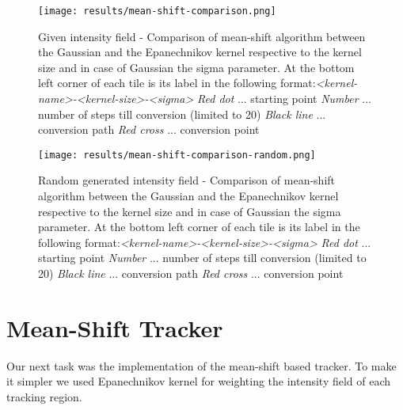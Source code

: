 \documentclass[runningheads]{llncs}
\begin{document}
\begin{figure}
    \centering
    \texttt{[image: results/mean-shift-comparison.png]}
    \caption{Given intensity field - Comparison of mean-shift algorithm between the Gaussian and the Epanechnikov kernel respective to the kernel size and in case of Gaussian the sigma parameter. At the bottom left corner of each tile is its label in the following format:\newline \textit{\textless kernel-name\textgreater-\textless kernel-size\textgreater-\textless sigma\textgreater}
    \newline \textit{Red dot} ... starting point
    \newline \textit{Number} ... number of steps till conversion (limited to 20)
    \newline \textit{Black line} ... conversion path
    \newline \textit{Red cross} ... conversion point}
    \label{img_meanshift}
\end{figure}

\begin{figure}
    \centering
    \texttt{[image: results/mean-shift-comparison-random.png]}
    \caption{Random generated intensity field - Comparison of mean-shift algorithm between the Gaussian and the Epanechnikov kernel respective to the kernel size and in case of Gaussian the sigma parameter. At the bottom left corner of each tile is its label in the following format:\newline \textit{\textless kernel-name\textgreater-\textless kernel-size\textgreater-\textless sigma\textgreater}
    \newline \textit{Red dot} ... starting point
    \newline \textit{Number} ... number of steps till conversion (limited to 20)
    \newline \textit{Black line} ... conversion path
    \newline \textit{Red cross} ... conversion point}
    \label{img_meanshift_random}
\end{figure}

\newpage
\section{Mean-Shift Tracker}

Our next task was the implementation of the mean-shift based tracker. To make it simpler we used Epanechnikov kernel for weighting the intensity field of each tracking region.
\end{document}
